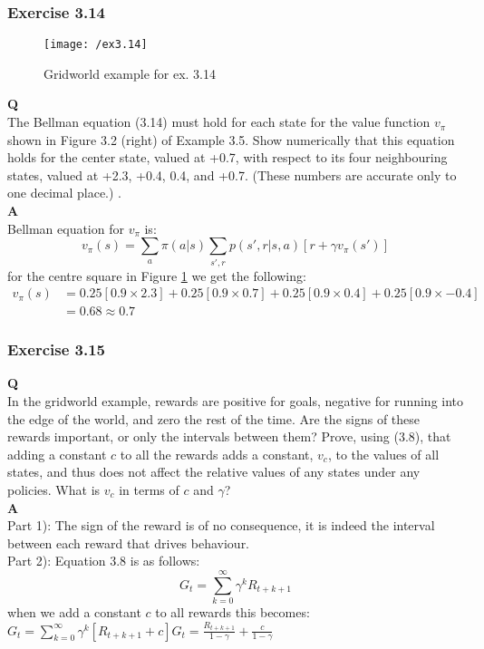 \subsubsection{Exercise 3.14}
\begin{figure}[h!]
	\centering
	\texttt{[image: /ex3.14]}
	\caption{Gridworld example for ex. 3.14}
	\label{fig:3.14}
\end{figure}

\textbf{Q}\\
The Bellman equation (3.14) must hold for each state for the value function $v_\pi$ shown in Figure 3.2 (right) of Example 3.5. Show numerically that this equation holds for the center state, valued at +0.7, with respect to its four neighbouring states, valued at +2.3, +0.4, 0.4, and +0.7. (These numbers are accurate only to one decimal place.) .  \\

\textbf{A}\\
Bellman equation for $v_\pi$ is:
\begin{equation}
v_\pi(s) = \sum_{a} \pi(a | s) \sum_{s', r} p(s', r | s, a) [r + \gamma v_\pi(s')] 
\end{equation}
for the centre square in Figure \ref{fig:3.14} we get the following:
\begin{align}
v_\pi(s) &= 0.25 \left[0.9 \times 2.3\right] + 0.25 \left[0.9 \times 0.7\right] + 0.25 \left[0.9 \times 0.4\right] + 0.25 \left[0.9 \times -0.4\right] \\
			&= 0.68 \approx 0.7 
\end{align}

\subsubsection{Exercise 3.15}
\textbf{Q}\\
In the gridworld example, rewards are positive for goals, negative for running into the edge of the world, and zero the rest of the time. Are the signs of these rewards important, or only the intervals between them? Prove, using (3.8), that adding a constant $c$ to all the rewards adds a constant, $v_c$, to the values of all states, and thus does not affect the relative values of any states under any policies. What is $v_c$ in terms of $c$ and $\gamma$? \\

\textbf{A}\\
Part 1): The sign of the reward is of no consequence, it is indeed the interval between each reward that drives behaviour.\\
Part 2): Equation 3.8 is as follows:
\begin{equation}
G_t = \sum_{k=0}^{\infty} \gamma^k R_{t+k+1}
\end{equation}
when we add a constant $c$ to all rewards this becomes:
$
G_t = \sum_{k=0}^{\infty} \gamma^k [R_{t+k+1} + c]
G_t = \frac{R_{t+k+1}}{1 - \gamma} + \frac{c}{1 - \gamma}
$


